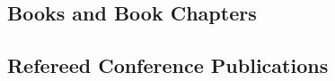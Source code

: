 \subsection{Books and Book Chapters}

\begin{pub}
\end{pub}


\subsection{Refereed Conference Publications}



